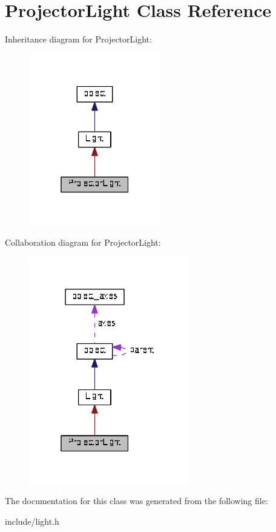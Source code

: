 \hypertarget{classProjectorLight}{}\section{Projector\+Light Class Reference}
\label{classProjectorLight}


Inheritance diagram for Projector\+Light\+:\nopagebreak
\begin{figure}[H]
\begin{center}
\leavevmode
\includegraphics[width=163pt]{classProjectorLight__inherit__graph}
\end{center}
\end{figure}


Collaboration diagram for Projector\+Light\+:\nopagebreak
\begin{figure}[H]
\begin{center}
\leavevmode
\includegraphics[width=196pt]{classProjectorLight__coll__graph}
\end{center}
\end{figure}


The documentation for this class was generated from the following file\+:\begin{DoxyCompactItemize}
\item 
include/light.\+h\end{DoxyCompactItemize}
